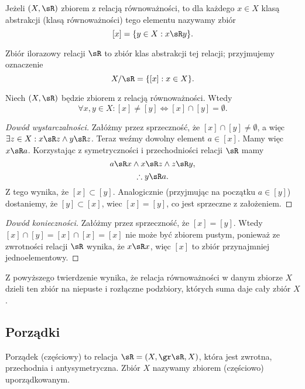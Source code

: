 \begin{definition}
    Jeżeli $(X, \sR)$ zbiorem z relacją równoważności, to dla każdego $x \in X$ klasą abstrakcji (klasą równoważności) tego elementu nazywamy zbiór
    $$ [x] = \{y \in X : x \sR y\}. $$
\end{definition}

\begin{definition}
    Zbiór ilorazowy relacji $\sR$ to zbiór klas abstrakcji tej relacji; przyjmujemy oznaczenie
    $$ X/\sR = \{[x] : x \in X\}. $$
\end{definition}

\begin{theorem}
    Niech $(X, \sR)$ będzie zbiorem z relacją równoważności. Wtedy
    $$ \forall x, y \in X : [x] \neq [y] \iff [x] \cap [y] = \emptyset . $$
\end{theorem}
\begin{proof}[Dowód wystarczalności]\renewcommand{\qedsymbol}{}
    Załóżmy przez sprzeczność, że $[x] \cap [y] \neq \emptyset$, a więc $\exists z \in X : x \sR z \wedge y \sR z$. Teraz weźmy dowolny element $a \in [x]$. Mamy więc $x \sR a$. Korzystając z symetryczności i przechodniości relacji $\sR$ mamy
    $$ a \sR x \wedge x \sR z \wedge z \sR y, $$
    $$ \therefore y \sR a. $$
    Z tego wynika, że $[x] \subset [y]$. Analogicznie (przyjmując na początku $a \in [y]$) dostaniemy, że $[y] \subset [x]$, wiec $[x] = [y]$, co jest sprzeczne z założeniem.
\end{proof}
\begin{proof}[Dowód konieczności]
    Załóżmy przez sprzeczność, że $[x] = [y]$. Wtedy $[x] \cap [y] = [x] \cap [x] = [x]$ nie może być zbiorem pustym, ponieważ ze zwrotności relacji $\sR$ wynika, że $x \sR x$, więc $[x]$ to zbiór przynajmniej jednoelementowy.
\end{proof}

Z powyższego twierdzenie wynika, że relacja równoważności w danym zbiorze $X$ dzieli ten zbiór na niepuste i rozłączne podzbiory, których suma daje cały zbiór $X$.

\subsection{Porządki}
\begin{definition}
    Porządek (częściowy) to relacja $\sR = (X, \gr\sR, X)$, która jest zwrotna, przechodnia i antysymetryczna. Zbiór $X$ nazywamy zbiorem (częściowo) uporządkowanym.
\end{definition}

